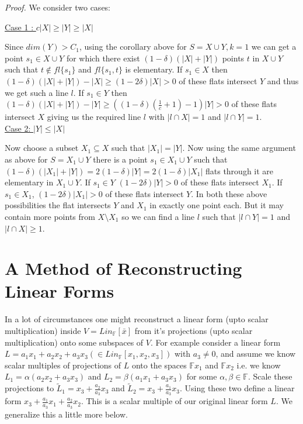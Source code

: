 \documentclass[letterpaper,USenglish,numberwithinsect]{lipics}
\newcommand{\F}{\mathbb{F}}
\newcommand{\B}[1]{\bar{#1}}
\begin{document}
\emph{Proof.}
We consider two cases:

\underline{Case 1 : $c|X|\geq |Y|\geq |X|$}

Since $dim(Y)>C_1$, using the corollary above for $S=X\cup Y, k=1$ we can get a
point $s_1 \in X\cup Y$ for which there exist $(1-\delta)(|X|+|Y|)$ points $t$
in $X\cup Y$
such that $t\notin fl\{s_1\}$ and $fl\{s_1,t\}$ is elementary.
If $s_1\in X$ then $(1-\delta)(|X|+|Y|)-|X| \geq (1-2\delta)|X|>0$ of these
flats intersect $Y$ and thus we get such a line $l$. If $s_1\in Y$ then
$(1-\delta)(|X|+|Y|)-|Y| \geq ((1-\delta)(\frac{1}{c}+1) -1)|Y| >0$ of these
flats intersect $X$ giving us the required line $l$ with $|l\cap X|=1$ and
$|l\cap Y|=1$.\\

\underline{Case 2: $|Y|\leq |X|$}

 Now choose a subset $X_1\subseteq X$ such that $|X_1|=|Y|$. Now using the same
argument
as above for $S = X_1\cup Y$ there is a point $s_1\in X_1\cup Y$ such that
$(1-\delta) (|X_1|+|Y|)= 2(1-\delta) |Y| = 2(1-\delta) |X_1|$ flats through
it are elementary in $X_1\cup Y$. If $s_1\in Y$ $(1-2\delta)|Y|>0$ of these
flats intersect $X_1$. If $s_1\in X_1$,
$(1-2\delta)|X_1| >0$ of these flats intersect $Y$. In both these above
possibilities the flat intersects $Y$ and $X_1$ in
exactly one point each. But it may contain more points from $X\setminus X_1$ so
we can find a line $l$ such that $|l\cap Y|=1$
and $|l\cap X|\geq 1$.



\section{A Method of Reconstructing Linear Forms}\label{Identifier}

In a lot of circumstances one might reconstruct a linear form (upto scalar multiplication) inside $V=Lin_\F[\B{x}]$ from it's projections
(upto scalar multiplication) onto some subspaces of $V$. For example consider a linear form $L=a_1x_1+a_2x_2+a_3x_3 (\in Lin_
\F[x_1,x_2,x_3])$ with $a_3\neq 0$,
and assume we know scalar multiples of projections of $L$ onto the spaces $\F x_1$ and $\F x_2$ i.e. we know $L_1=\alpha(a_2x_2+a_3x_3)$ and
$L_2=\beta(a_1x_1+a_3x_3)$ for some $\alpha,\beta\in \F$. Scale these projections to $\tilde L_1 = x_3+\frac{a_2}{a_3}x_3$ and
$\tilde L_2 = x_3 + \frac{a_1}{a_3}x_3$. Using these two define a linear form $x_3+\frac{a_1}{a_3}x_1 + \frac{a_2}{a_3}x_2$. This is
a scalar multiple of our original linear form $L$. We generalize this a little more below.\\
\end{document}

